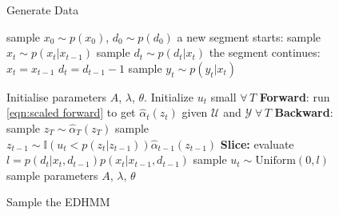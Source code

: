 \begin{figure*}[ttt!]
\begin{minipage}[t]{2in}
\begin{algorithm}[H]
    \caption{Generate Data}
    \label{alg:gen}
    \begin{algorithmic}
        \STATE sample $x_0 \sim p(x_0)$, $d_0 \sim p(d_0)$
                \STATE a new segment starts:
                \STATE sample $x_t \sim p(x_t | x_{t-1})$
                \STATE sample $d_t \sim p(d_t | x_t)$
            \ELSE
                \STATE the segment continues:
                \STATE $x_t = x_{t-1}$
                \STATE $d_t = d_{t-1} - 1$
            \ENDIF
        \STATE sample $y_t \sim p(y_t | x_t)$
        \ENDFOR
    \end{algorithmic}
\end{algorithm} 
 \end{minipage}
 \hfill
 \begin{minipage}[t]{3.3in}
\begin{algorithm}[H]
    \caption{Sample the EDHMM}
    \label{alg:beam}
    \begin{algorithmic}
\STATE Initialise parameters $A$, $\lambda$, $\theta.$ Initialize $u_t$ small $\forall\, T$
    \STATE \textbf{Forward}: run \eqref{eqn:scaled forward} to get $\hat{\alpha}_t(z_t)$ given $\mathcal{U}$ and $\mathcal{Y} \; \forall\, T$
    \STATE \textbf{Backward}: sample $z_T \sim \hat{\alpha}_T(z_T)$
        \STATE sample $z_{t-1} \sim \mathbb{I}(u_t < p(z_{t} | z_{t-1}))\hat{\alpha}_{t-1}(z_{t-1})$
    \ENDFOR
\STATE \textbf{Slice:}
    \STATE evaluate $l = p(d_t|x_t,d_{t-1})p(x_t|x_{t-1},d_{t-1})$
    \STATE sample $u_{t} \sim \mathrm{Uniform}(0,l)$
    \ENDFOR
\STATE sample parameters $A$, $\lambda$, $\theta$
\ENDFOR
\end{algorithmic}
\end{algorithm}
\end{minipage}
 \hfill
\end{figure*}